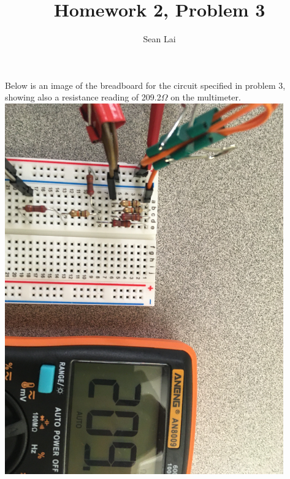 \documentclass[10pt,letterpaper]{article}
\author{Sean Lai}
\title{Homework 2, Problem 3}
\begin{document}
\maketitle
\thispagestyle{empty}
Below is an image of the breadboard for the circuit specified in problem 3, showing also a resistance reading of 209.2$\Omega$ on the multimeter.
\newline
\newline
\includegraphics[width=12cm]{breadboard}
\centering
\end{document}

